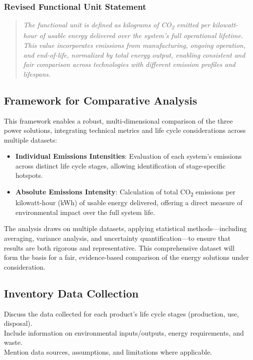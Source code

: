 \documentclass{article}
\begin{document}
\subsubsection*{Revised Functional Unit Statement}
\begin{quote}
	\textit{The functional unit is defined as kilograms of CO\textsubscript{2} emitted per kilowatt-hour of usable energy delivered over the system's full operational lifetime. This value incorporates emissions from manufacturing, ongoing operation, and end-of-life, normalized by total energy output, enabling consistent and fair comparison across technologies with different emission profiles and lifespans.}
\end{quote}


\subsection{Framework for Comparative Analysis}
This framework enables a robust, multi-dimensional comparison of the three power solutions, integrating technical metrics and life cycle considerations across multiple datasets:
\begin{itemize}[itemsep=-1mm]
	\item \textbf{Individual Emissions Intensities}: Evaluation of each system's emissions across distinct life cycle stages, allowing identification of stage-specific hotspots.
	\item \textbf{Absolute Emissions Intensity}: Calculation of total CO\textsubscript{2} emissions per kilowatt-hour (kWh) of usable energy delivered, offering a direct measure of environmental impact over the full system life.
\end{itemize}
The analysis draws on multiple datasets, applying statistical methods—including averaging, variance analysis, and uncertainty quantification—to ensure that results are both rigorous and representative. This comprehensive dataset will form the basis for a fair, evidence-based comparison of the energy solutions under consideration.

\subsection{Inventory Data Collection}
Discuss the data collected for each product’s life cycle stages (production, use, disposal).\\
Include information on environmental inputs/outputs, energy requirements, and waste.\\
Mention data sources, assumptions, and limitations where applicable.
\end{document}
